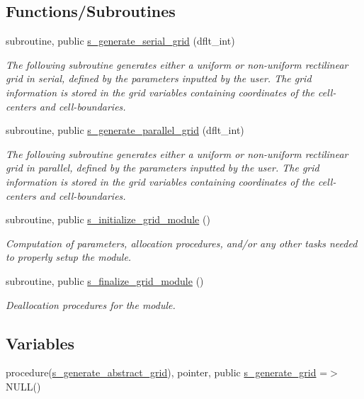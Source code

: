 \subsection*{Functions/\+Subroutines}
\begin{DoxyCompactItemize}
\item 
subroutine, public \hyperlink{namespacem__grid_a7c0d1c6fcecd2759774be2b3786a6b50}{s\+\_\+generate\+\_\+serial\+\_\+grid} (dflt\+\_\+int)
\begin{DoxyCompactList}\small\item\em The following subroutine generates either a uniform or non-\/uniform rectilinear grid in serial, defined by the parameters inputted by the user. The grid information is stored in the grid variables containing coordinates of the cell-\/ centers and cell-\/boundaries. \end{DoxyCompactList}\item 
subroutine, public \hyperlink{namespacem__grid_abcc7c446abd0c768e42b2a2f7323a2d7}{s\+\_\+generate\+\_\+parallel\+\_\+grid} (dflt\+\_\+int)
\begin{DoxyCompactList}\small\item\em The following subroutine generates either a uniform or non-\/uniform rectilinear grid in parallel, defined by the parameters inputted by the user. The grid information is stored in the grid variables containing coordinates of the cell-\/ centers and cell-\/boundaries. \end{DoxyCompactList}\item 
subroutine, public \hyperlink{namespacem__grid_a08c7d18352873ceab95c10629c1ce317}{s\+\_\+initialize\+\_\+grid\+\_\+module} ()
\begin{DoxyCompactList}\small\item\em Computation of parameters, allocation procedures, and/or any other tasks needed to properly setup the module. \end{DoxyCompactList}\item 
subroutine, public \hyperlink{namespacem__grid_a128e8c4d55df21039d945edda39205aa}{s\+\_\+finalize\+\_\+grid\+\_\+module} ()
\begin{DoxyCompactList}\small\item\em Deallocation procedures for the module. \end{DoxyCompactList}\end{DoxyCompactItemize}
\subsection*{Variables}
\begin{DoxyCompactItemize}
\item 
procedure(\hyperlink{interfacem__grid_1_1s__generate__abstract__grid}{s\+\_\+generate\+\_\+abstract\+\_\+grid}), pointer, public \hyperlink{namespacem__grid_a3af3e5a8e440ff542dfd274546fb8150}{s\+\_\+generate\+\_\+grid} =$>$ N\+U\+LL()
\end{DoxyCompactItemize}


